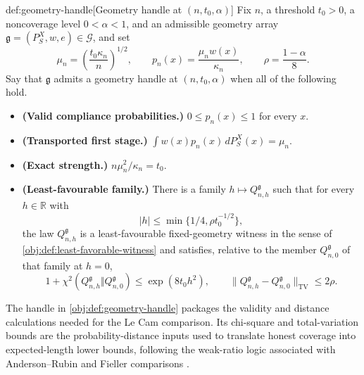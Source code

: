 \documentclass[11pt]{article}
\begin{document}
\begin{definitionv}{def:geometry-handle}[Geometry handle at \((n,t_0,\alpha)\)]
Fix \(n\), a threshold \(t_0>0\), a noncoverage level \(0<\alpha<1\), and an admissible geometry array \(\mathfrak g=(P_S^X,w,e)\in\mathcal G\), and set
\[
\mu_n=\left(\frac{t_0\kappa_n}{n}\right)^{1/2},
\qquad
p_n(x)=\frac{\mu_n w(x)}{\kappa_n},
\qquad
\rho=\frac{1-\alpha}{8}.
\]
Say that \(\mathfrak g\) admits a geometry handle at \((n,t_0,\alpha)\) when all of the following hold.
\begin{itemize}
\item \textbf{(Valid compliance probabilities.)} \(0\le p_n(x)\le 1\) for every \(x\).
\item \textbf{(Transported first stage.)} \(\int w(x)p_n(x)\,dP_S^X(x)=\mu_n\).
\item \textbf{(Exact strength.)} \(n\mu_n^2/\kappa_n=t_0\).
\item \textbf{(Least-favourable family.)} There is a family \(h\mapsto Q_{n,h}^{\mathfrak g}\) such that for every \(h\in\mathbb R\) with
\[
|h|\le \min\{1/4,\rho t_0^{-1/2}\},
\]
the law \(Q_{n,h}^{\mathfrak g}\) is a least-favourable fixed-geometry witness in the sense of \cref{obj:def:least-favorable-witness} and satisfies, relative to the member \(Q_{n,0}^{\mathfrak g}\) of that family at \(h=0\),
\[
1+\chi^2(Q_{n,h}^{\mathfrak g}\Vert Q_{n,0}^{\mathfrak g})\le\exp(8t_0h^2),
\qquad
\|Q_{n,h}^{\mathfrak g}-Q_{n,0}^{\mathfrak g}\|_{\mathrm{TV}}\le2\rho.
\]
\end{itemize}
\end{definitionv}

The handle in \cref{obj:def:geometry-handle} packages the validity and distance calculations needed for the Le Cam comparison. Its chi-square and total-variation bounds are the probability-distance inputs used to translate honest coverage into expected-length lower bounds, following the weak-ratio logic associated with Anderson--Rubin and Fieller comparisons \citep{AndersonRubin1949,Fieller1954,GleserHwang1987,Dufour1997}.
\end{document}
